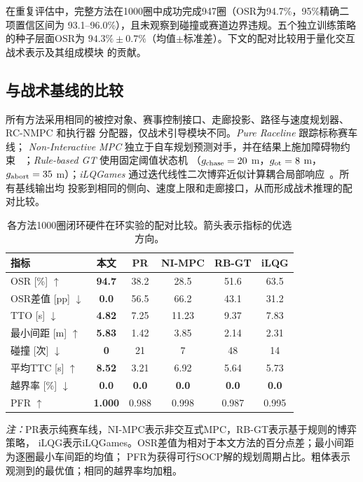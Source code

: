 \documentclass[final,5p,twocolumn]{elsarticle}
\begin{document}
在重复评估中，完整方法在1000圈中成功完成947圈（OSR为94.7\%，95\%精确二项置信区间为
93.1--96.0\%），且未观察到碰撞或赛道边界违规。五个独立训练策略的种子层面OSR为
$94.3\%\pm0.7\%$（均值$\pm$标准差）。下文的配对比较用于量化交互战术表示及其组成模块
的贡献。


\subsection{与战术基线的比较}
\label{subsec:comparison}

所有方法采用相同的被控对象、赛事控制接口、走廊投影、路径与速度规划器、RC-NMPC 和执行器
分配器，仅战术引导模块不同。\emph{Pure Raceline} 跟踪标称赛车线；
\emph{Non-Interactive MPC} 独立于自车规划预测对手，并在结果上施加障碍物约束
~\cite{kabzan2020amzracing,betz2023autonomous}；\emph{Rule-based GT} 使用固定阈值状态机
（$g_{\rm chase}=20$ m，$g_{\rm ot}=8$ m，$g_{\rm abort}=35$ m）；\emph{iLQGames}
通过迭代线性二次博弈近似计算耦合局部响应~\cite{fridovich2020ilqgames}。所有基线输出均
投影到相同的侧向、速度上限和走廊接口，从而形成战术推理的配对比较。

\begin{table}[!tbp]
\centering
\footnotesize
\setlength{\tabcolsep}{2.3pt}
\renewcommand{\arraystretch}{1.08}
\caption{各方法1000圈闭环硬件在环实验的配对比较。箭头表示指标的优选方向。}
\label{tab:comparison}
\begin{tabular}{@{}lccccc@{}}
\toprule
指标 & 本文 & PR & NI-MPC & RB-GT & iLQG \\
\midrule
OSR [\%] $\uparrow$             & \textbf{94.7} & 38.2 & 28.5 & 51.6 & 63.5 \\
OSR差值 [pp] $\downarrow$      & \textbf{0.0} & 56.5 & 66.2 & 43.1 & 31.2 \\
TTO [s] $\downarrow$            & \textbf{4.82} & 7.25 & 11.23 & 9.37 & 7.83 \\
最小间距 [m] $\uparrow$         & \textbf{5.83} & 1.42 & 3.85 & 2.14 & 2.31 \\
碰撞 [次] $\downarrow$      & \textbf{0} & 21 & 7 & 48 & 14 \\
平均TTC [s] $\uparrow$         & \textbf{8.52} & 3.21 & 6.92 & 5.64 & 5.73 \\
越界率 [\%] $\downarrow$  & \textbf{0.0} & \textbf{0.0} & \textbf{0.0} & \textbf{0.0} & \textbf{0.0} \\
PFR $\uparrow$                  & \textbf{1.000} & 0.988 & 0.998 & 0.987 & 0.995 \\
\bottomrule
\end{tabular}
\vspace{1mm}

\begin{minipage}{\columnwidth}
\scriptsize
\emph{注：}PR表示纯赛车线，NI-MPC表示非交互式MPC，RB-GT表示基于规则的博弈策略，
iLQG表示iLQGames。OSR差值为相对于本文方法的百分点差；最小间距为逐圈最小车间距的均值；
PFR为获得可行SOCP解的规划周期占比。粗体表示观测到的最优值；相同的越界率均加粗。
\end{minipage}
\end{table}
\end{document}
